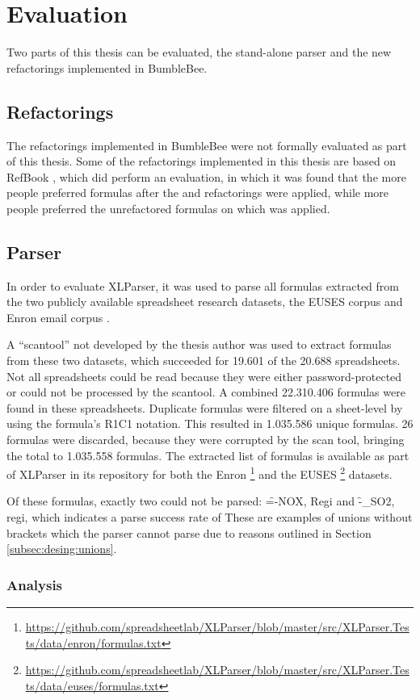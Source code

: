 
\chapter{Evaluation}
\label{chapter:evaluation}

Two parts of this thesis can be evaluated, the stand-alone parser and the new refactorings implemented in BumbleBee.

\section{Refactorings}

The refactorings implemented in BumbleBee were not formally evaluated as part of this thesis.
Some of the refactorings implemented in this thesis are based on RefBook \cite{badame2012refactoring}, which did perform an evaluation, in which it was found that the more people preferred formulas after the  and  refactorings were applied, while more people preferred the unrefactored formulas on which  was applied.

\section{Parser}

In order to evaluate XLParser, it was used to parse all formulas extracted from the two publicly available spreadsheet research datasets, the EUSES corpus \cite{fisher2005euses} and Enron email corpus \cite{klimt2004enron, hermans2015enron}.

A ``scantool'' not developed by the thesis author was used to extract formulas from these two datasets, which succeeded for 19.601 of the 20.688 spreadsheets.
Not all spreadsheets could be read because they were either password-protected or could not be processed by the scantool.
A combined 22.310.406 formulas were found in these spreadsheets.
Duplicate formulas were filtered on a sheet-level by using the formula's R1C1 notation.
This resulted in 1.035.586 unique formulas.
26 formulas were discarded, because they were corrupted by the scan tool, bringing the total to 1.035.558 formulas.
The extracted list of formulas is available as part of XLParser in its repository for both the Enron \footnote{\url{https://github.com/spreadsheetlab/XLParser/blob/master/src/XLParser.Tests/data/enron/formulas.txt}} and the EUSES \footnote{\url{https://github.com/spreadsheetlab/XLParser/blob/master/src/XLParser.Tests/data/euses/formulas.txt}} datasets.

Of these formulas, exactly two could not be parsed: \f{=-NOX, Regi} and \f{-_SO2, regi}, which indicates a parse success rate of 
These are examples of unions without brackets which the parser cannot parse due to reasons outlined in Section \ref{subsec:desing:unions}.

\subsection{Analysis}

